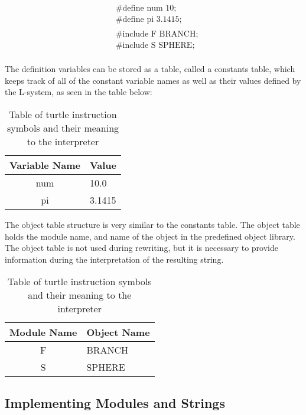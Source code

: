\begin{equation} \label{constant and object example}
\begin{aligned}
	&\text{\#define num 10;}\\
	&\text{\#define pi 3.1415;}\\
	&\\
	&\text{\#include F BRANCH;}\\
	&\text{\#include S SPHERE;}\\
\end{aligned}
\end{equation}

\noindent
The definition variables can be stored as a table, called a constants table, which keeps track of all of the constant variable names as well as their values defined by the L-system, as seen in the table below: 

\begin{table}[h!] \center
\begin{tabular}{ | c | l | }
\hline
	Variable Name 	& Value\\  
\hline
\hline
	num 				& 10.0\\
\hline
	pi					& 3.1415\\
\hline
\end{tabular}
\caption{Table of turtle instruction symbols and their meaning to the interpreter}
\label{constants table}
\end{table}
\FloatBarrier

\noindent
The object table structure is very similar to the constants table. The object table holds the module name, and name of the object in the predefined object library. The object table is not used during rewriting, but it is necessary to provide information during the interpretation of the resulting string. 

\begin{table}[h!] \center
\begin{tabular}{ | c | l | }
\hline
	Module Name	& Object Name\\  
\hline
\hline
	F 				& BRANCH\\
\hline
	S				& SPHERE\\
\hline
\end{tabular}
\caption{Table of turtle instruction symbols and their meaning to the interpreter}
\label{constants table}
\end{table}
\FloatBarrier

\subsection{Implementing Modules and Strings} \label{modules and strings}

